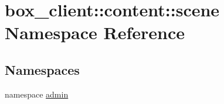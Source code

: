 \hypertarget{namespacebox__client_1_1content_1_1scene}{
\section{box\_\-client::content::scene Namespace Reference}
\label{namespacebox__client_1_1content_1_1scene}
}
\subsection*{Namespaces}
\begin{DoxyCompactItemize}
\item 
namespace \hyperlink{namespacebox__client_1_1content_1_1scene_1_1admin}{admin}
\end{DoxyCompactItemize}
